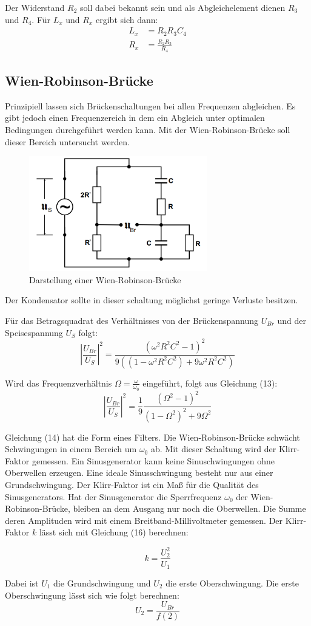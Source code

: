 Der Widerstand $R_2$ soll dabei bekannt sein und als Abgleichelement dienen $R_3$ und $R_4$.
Für $L_x$ und $R_x$ ergibt sich dann:
\begin{align}
  L_x &= R_2 R_3 C_4 \\
  R_x &= \frac{R_2 R_3}{R_4}
\end{align}


\subsection{Wien-Robinson-Brücke}
Prinzipiell lassen sich Brückenschaltungen bei allen Frequenzen abgleichen. Es gibt jedoch einen
Frequenzereich in dem ein Abgleich unter optimalen Bedingungen durchgeführt werden kann. Mit der
Wien-Robinson-Brücke soll dieser Bereich untersucht werden.

\begin{figure}[H]
  \centering
  \includegraphics[height=5cm]{wien.PNG}
  \caption{Darstellung einer Wien-Robinson-Brücke}
  \label{fig:wien}
\end{figure}
Der Kondensator sollte in dieser schaltung möglichst geringe Verluste besitzen.

Für das Betragsquadrat des Verhältnisses von der Brückenspannung $U_{Br}$ und der Speisespannung $U_S$ folgt:
\begin{equation}
  \left|\frac{U_{Br}}{U_S} \right|^2 = \frac{(\omega^2 R^2 C^2 -1)^2}{9((1- \omega^2 R^2 C^2) + 9 \omega^2 R^2 C^2)}
\end{equation}

Wird das Frequenzverhältnis $\Omega = \frac{\omega}{\omega_0}$ eingeführt, folgt aus Gleichung (13):
\begin{equation}
  \left|\frac{U_{Br}}{U_S} \right|^2 = \frac{1}{9} \frac{(\Omega^2 -1)^2}{(1- \Omega^2)^2 + 9 \Omega^2}
\end{equation}

Gleichung (14) hat die Form eines Filters. Die Wien-Robinson-Brücke schwächt Schwingungen in einem
Bereich um $\omega_0$ ab. Mit dieser Schaltung wird der Klirr-Faktor gemessen. Ein Sinusgenerator kann keine
Sinuschwingungen ohne Oberwellen erzeugen. Eine ideale Sinusschwingung besteht nur aus einer Grundschwingung.
Der Klirr-Faktor ist ein Maß für die Qualität des Sinusgenerators. Hat der Sinusgenerator die Sperrfrequenz $\omega_0$
der Wien-Robinson-Brücke, bleiben an dem Ausgang nur noch die Oberwellen. Die Summe deren Amplituden wird mit einem
Breitband-Millivoltmeter gemessen. Der Klirr-Faktor $k$ lässt sich mit Gleichung (16) berechnen:

\begin{equation}
  k = \frac{U_2^2}{U_1}
\end{equation}

Dabei ist $U_1$ die Grundschwingung und $U_2$ die erste Oberschwingung. Die erste Oberschwingung lässt sich wie folgt
berechnen:
\begin{equation}
  U_2 = \frac{U_{Br}}{f(2)}
\end{equation}
